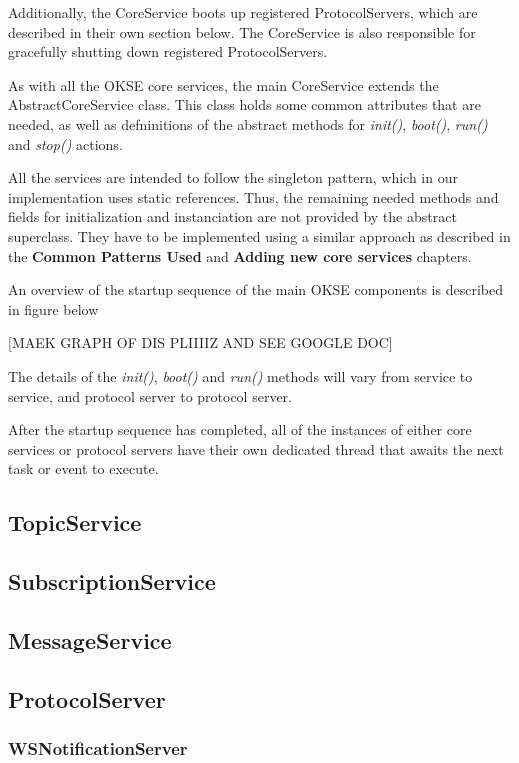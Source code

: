 Additionally, the CoreService boots up registered ProtocolServers, which are described in their own section below. The CoreService is also responsible for gracefully shutting down registered ProtocolServers.

As with all the OKSE core services, the main CoreService extends the AbstractCoreService class. This class holds some common attributes that are needed, as well as defninitions of the abstract methods for \textit{init()}, \textit{boot()}, \textit{run()} and \textit{stop()} actions.

All the services are intended to follow the singleton pattern, which in our implementation uses static references. Thus, the remaining needed methods and fields for initialization and instanciation are not provided by the abstract superclass. They have to be implemented using a similar approach as described in the \textbf{Common Patterns Used} and \textbf{Adding new core services} chapters.

An overview of the startup sequence of the main OKSE components is described in figure below

[MAEK GRAPH OF DIS PLIIIIZ AND SEE GOOGLE DOC]

The details of the \textit{init()}, \textit{boot()} and \textit{run()} methods will vary from service to service, and protocol server to protocol server.

After the startup sequence has completed, all of the instances of either core services or protocol servers have their own dedicated thread that awaits the next task or event to execute.

\subsection{TopicService}

\subsection{SubscriptionService}

\subsection{MessageService}

\subsection{ProtocolServer}
 
\subsubsection{WSNotificationServer}

